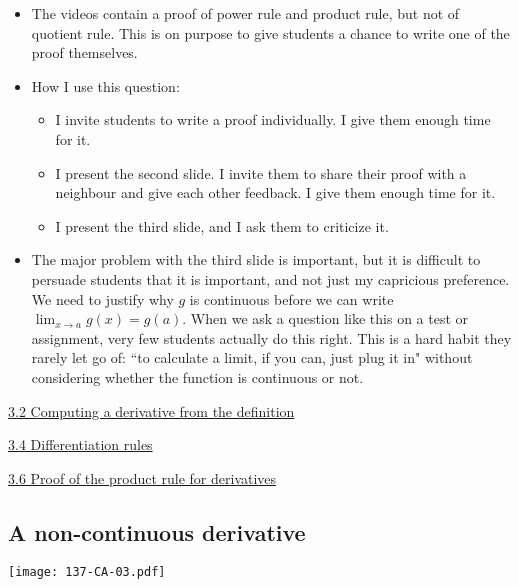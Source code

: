 \documentclass[11pt]{article}
\newcommand {\DS} [1] {${\displaystyle #1}$}
\newcommand{\nl}{\hfill \vspace{-1.1\baselineskip}} %
\newcommand{\vii}{\hspace{8mm} \href{https://www.youtube.com/watch?v=eNcg9cKzV1Q&list=PLlwePzQY_wW8qiZD6XYqCnibdY37ygbx7&index=2}{3.2 Computing a derivative from the definition}}
\newcommand{\viv}{\hspace{8mm} \href{https://www.youtube.com/watch?v=k_VxtK1U9jk&list=PLlwePzQY_wW8qiZD6XYqCnibdY37ygbx7&index=4}{3.4 Differentiation rules}}
\newcommand{\vvi}{\hspace{8mm} \href{https://www.youtube.com/watch?v=GwxWAJP77ZY&list=PLlwePzQY_wW8qiZD6XYqCnibdY37ygbx7&index=6}{3.6 Proof of the product rule for derivatives}}
\begin{document}
\begin{comments}
\nl
	\begin{itemize}
		\item  The videos contain a proof of power rule and product rule, but not of quotient rule.  This is on purpose to give students a chance to write one of the proof themselves.
		\item How I use this question:
			\begin{itemize}
				\item  I invite students to write a proof individually.  I give them enough time for it.
				\item  I present the second slide.  I invite them to share their proof with a neighbour and give each other feedback.  I give them enough time for it.
				\item I present the third slide, and I ask them to criticize it.
			\end{itemize}
		\item  The major problem with the third slide is important, but it is difficult to persuade students that it is important, and not just my capricious preference.    We need to justify why $g$ is continuous before we can write \DS{\lim_{x \to a} g(x) = g(a)}.  When we ask a question like this on a test or assignment, very few students actually do this right.    This is a hard habit they rarely let go of:  ``to calculate a limit, if you can, just plug it in" without considering whether the function is continuous or not.  	\end{itemize}	
\end{comments}

\newpage
\begin{videos}
\vii

\viv

\vvi
\end{videos}

\newpage


\subsection{A non-continuous derivative} 

\begin{center}
{ \texttt{[image: 137-CA-03.pdf]}} 

\end{center}
\end{document}
